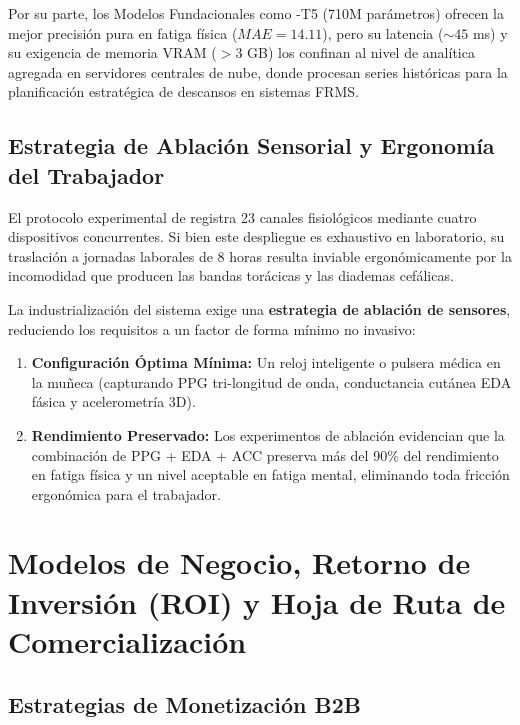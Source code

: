 Por su parte, los Modelos Fundacionales como \chronos{}-T5 (710M parámetros) ofrecen la mejor precisión pura en fatiga física ($MAE = 14.11$), pero su latencia ($\sim 45$ ms) y su exigencia de memoria VRAM ($>3$ GB) los confinan al nivel de analítica agregada en servidores centrales de nube, donde procesan series históricas para la planificación estratégica de descansos en sistemas FRMS.

\subsection{Estrategia de Ablación Sensorial y Ergonomía del Trabajador}

El protocolo experimental de \fatigueset{} registra 23 canales fisiológicos mediante cuatro dispositivos concurrentes. Si bien este despliegue es exhaustivo en laboratorio, su traslación a jornadas laborales de 8 horas resulta inviable ergonómicamente por la incomodidad que producen las bandas torácicas y las diademas cefálicas.

La industrialización del sistema exige una \textbf{estrategia de ablación de sensores}, reduciendo los requisitos a un factor de forma mínimo no invasivo:
\begin{enumerate}
    \item \textbf{Configuración Óptima Mínima:} Un reloj inteligente o pulsera médica en la muñeca (capturando PPG tri-longitud de onda, conductancia cutánea EDA fásica y acelerometría 3D).
    \item \textbf{Rendimiento Preservado:} Los experimentos de ablación evidencian que la combinación de PPG + EDA + ACC preserva más del 90\% del rendimiento en fatiga física y un nivel aceptable en fatiga mental, eliminando toda fricción ergonómica para el trabajador.
\end{enumerate}



\section{Modelos de Negocio, Retorno de Inversión (ROI) y Hoja de Ruta de Comercialización}
\label{sec:val_negocio_roadmap}

\subsection{Estrategias de Monetización B2B}

